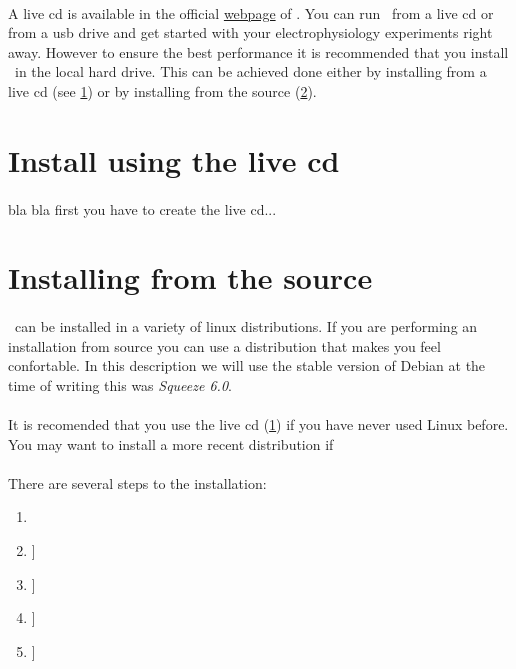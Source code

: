 \paragraph{}
A live cd is available in the official \href{http://www.tnb.ua.ac.be}{webpage} of \progname. You can run \progname\ from a live cd or from a usb drive and get started with your electrophysiology experiments right away. However to ensure the best performance it is recommended that you install \progname\ in the local hard drive. This can be achieved done either by installing from a live cd (see \ref{install:live_cd}) or by installing from the source (\ref{install:source}).

\section{Install using the live cd}
\label{install:live_cd}

\paragraph{}
bla bla first you have to create the live cd...

\section{Installing from the source}
\label{install:source}

\paragraph{}
\texttt{\progname}\ can be installed in a variety of linux distributions. If you are performing an installation from source you can use a distribution that makes you feel confortable. In this description we will use the stable version of Debian at the time of writing this was \emph{Squeeze 6.0}.
\paragraph{}
 It is recomended that you use the live cd (\ref{install:live_cd}) if you have never used Linux before. You may want to install a more recent distribution if 
\paragraph{}
There are several steps to the installation:

\begin{enumerate}
	\item {}
	\item {}]
	\item {}]
	\item {}]
	\item {}]
\end{enumerate}

